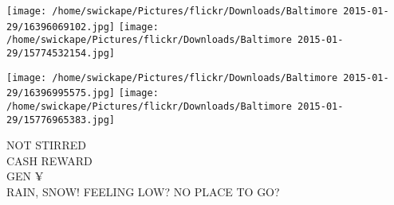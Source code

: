\documentclass[10pt,letterpaper]{article}
\begin{document}
\texttt{[image: /home/swickape/Pictures/flickr/Downloads/Baltimore 2015-01-29/16396069102.jpg]}
\texttt{[image: /home/swickape/Pictures/flickr/Downloads/Baltimore 2015-01-29/15774532154.jpg]}

\texttt{[image: /home/swickape/Pictures/flickr/Downloads/Baltimore 2015-01-29/16396995575.jpg]}
\texttt{[image: /home/swickape/Pictures/flickr/Downloads/Baltimore 2015-01-29/15776965383.jpg]}

NOT STIRRED\\
CASH REWARD\\
GEN ¥\\
RAIN, SNOW!  FEELING LOW?  NO PLACE TO GO?
\pagebreak
\end{document}
